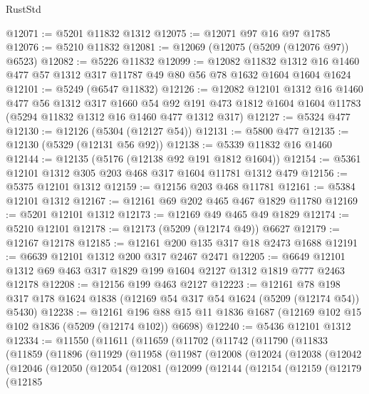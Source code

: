 \begin{lexlean}{RustStd}
\begin{coremodule}
@12071 := @5201 @11832 @1312
@12075 := @12071 @97 @16 @97 @1785
@12076 := @5210 @11832
@12081 := @12069 (@12075 (@5209 (@12076 @97)) @6523)
@12082 := @5226 @11832
@12099 := @12082
    @11832
    @1312
    @16
    @1460
    @477
    @57
    @1312
    @317
    @11787
    @49
    @80
    @56
    @78
    @1632
    @1604
    @1604
    @1624
@12101 := @5249 (@6547 @11832)
@12126 := @12082
    @12101
    @1312
    @16
    @1460
    @477
    @56
    @1312
    @317
    @1660
    @54
    @92
    @191
    @473
    @1812
    @1604
    @1604
    @11783
    (@5294 @11832 @1312 @16 @1460 @477 @1312 @317)
@12127 := @5324 @477
@12130 := @12126 (@5304 (@12127 @54))
@12131 := @5800 @477
@12135 := @12130 (@5329 (@12131 @56 @92))
@12138 := @5339 @11832 @16 @1460
@12144 := @12135 (@5176 (@12138 @92 @191 @1812 @1604))
@12154 := @5361 @12101 @1312 @305 @203 @468 @317 @1604 @11781 @1312 @479
@12156 := @5375 @12101 @1312
@12159 := @12156 @203 @468 @11781
@12161 := @5384 @12101 @1312
@12167 := @12161 @69 @202 @465 @467 @1829 @11780
@12169 := @5201 @12101 @1312
@12173 := @12169 @49 @465 @49 @1829
@12174 := @5210 @12101
@12178 := @12173 (@5209 (@12174 @49)) @6627
@12179 := @12167 @12178
@12185 := @12161 @200 @135 @317 @18 @2473 @1688
@12191 := @6639 @12101 @1312 @200 @317 @2467 @2471
@12205 := @6649 @12101 @1312 @69 @463 @317 @1829 @199 @1604 @2127 @1312 @1819 @777 @2463 @12178
@12208 := @12156 @199 @463 @2127
@12223 := @12161
    @78
    @198
    @317
    @178
    @1624
    @1838
    (@12169 @54 @317 @54 @1624 (@5209 (@12174 @54)) @5430)
@12238 := @12161
    @196
    @88
    @15
    @11
    @1836
    @1687
    (@12169 @102 @15 @102 @1836 (@5209 (@12174 @102)) @6698)
@12240 := @5436 @12101 @1312
@12334 := @11550
    (@11611
      (@11659
        (@11702
          (@11742
            (@11790
              (@11833
                (@11859
                  (@11896
                    (@11929
                      (@11958
                        (@11987
                          (@12008
                            (@12024
                              (@12038
                                (@12042
                                  (@12046
                                    (@12050
                                      (@12054
                                        (@12081
                                          (@12099
                                            (@12144
                                              (@12154
                                                (@12159
                                                  (@12179
                                                    (@12185

\end{coremodule}
\end{lexlean}
